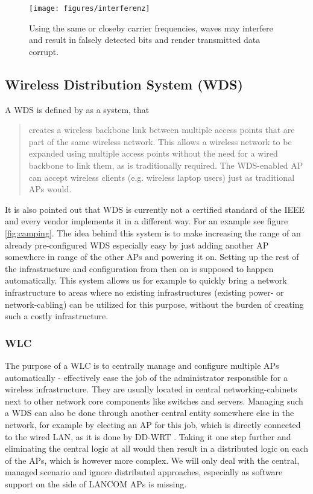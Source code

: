 	\begin{figure}[h!]
	  \centering
	  \texttt{[image: figures/interferenz]}
	  \caption{Using the same or closeby carrier frequencies, waves may interfere and result in falsely detected bits and render transmitted data corrupt.}
	  \label{fig:interferenz}
	\end{figure}
	
\newpage
	      
    \subsection{Wireless Distribution System (WDS)}
      A \ac{WDS} is defined by \cite{dd_wrt} as a system, that
      
      \begin{quote}
	creates a wireless backbone link between multiple access points that are part of the same wireless network. 
	This allows a wireless network to be expanded using multiple access points without the need for a wired backbone to link them, as is traditionally required. 
	The WDS-enabled \ac{AP} can accept wireless clients (e.g. wireless laptop users) just as traditional APs would.
      \end{quote}

      It is also pointed out that WDS is currently not a certified standard of the \ac{IEEE} and every vendor implements it in a different way.
      For an example see figure \ref{fig:camping}. The idea behind this system is to make increasing the range of an already pre-configured \ac{WDS}
      especially easy by just adding another \ac{AP} somewhere in range of the other APs and powering it on.
      Setting up the rest of the infrastructure and configuration from then on is supposed to happen automatically. 
      This system allows us for example to quickly bring a network infrastructure to areas where no 
      existing infrastructures (existing power- or network-cabling) can be utilized for this purpose, without the burden of creating such a costly infrastructure.
      
      \subsubsection{\ac{WLC}}
	The purpose of a \ac{WLC} is to centrally manage and configure multiple APs automatically - effectively ease the job of the administrator responsible for a 
	wireless infrastructure. They are usually located in central networking-cabinets next to other network core components like switches and servers.
	Managing such a \ac{WDS} can also be done through another central entity somewhere else in the network, for example by
	electing an \ac{AP} for this job, which is directly connected to the wired \ac{LAN}, as it is done by DD-WRT \cite{dd_wrt}. 
	Taking it one step further and eliminating the central logic at all would then result in a distributed logic on each of the APs, which is however more complex. 
	We will only deal with the central, managed scenario and ignore distributed approaches, especially as software support on the side of LANCOM APs is missing.
	
